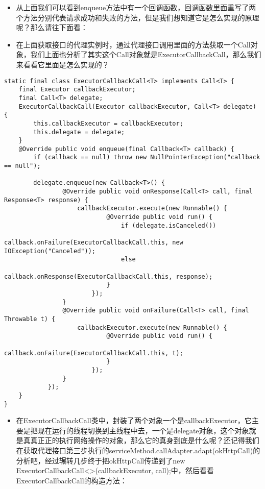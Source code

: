\documentclass[9pt, b5paper]{article}
\begin{document}
\begin{itemize}
\item 从上面我们可以看到enqueue方法中有一个回调函数，回调函数里面重写了两个方法分别代表请求成功和失败的方法，但是我们想知道它是怎么实现的原理呢？那么请往下面看：
\item 在上面获取接口的代理实例时，通过代理接口调用里面的方法获取一个Call对象，我们上面也分析了其实这个Call对象就是ExecutorCallbackCall，那么我们来看看它里面是怎么实现的？
\end{itemize}
\begin{verbatim}
static final class ExecutorCallbackCall<T> implements Call<T> {
    final Executor callbackExecutor;
    final Call<T> delegate;
    ExecutorCallbackCall(Executor callbackExecutor, Call<T> delegate) {
        this.callbackExecutor = callbackExecutor;
        this.delegate = delegate;
    }
    @Override public void enqueue(final Callback<T> callback) {
        if (callback == null) throw new NullPointerException("callback == null");

        delegate.enqueue(new Callback<T>() {
                @Override public void onResponse(Call<T> call, final Response<T> response) {
                    callbackExecutor.execute(new Runnable() {
                            @Override public void run() {
                                if (delegate.isCanceled()) 
                                    callback.onFailure(ExecutorCallbackCall.this, new IOException("Canceled"));
                                else 
                                    callback.onResponse(ExecutorCallbackCall.this, response);
                            }
                        });
                }
                @Override public void onFailure(Call<T> call, final Throwable t) {
                    callbackExecutor.execute(new Runnable() {
                            @Override public void run() {
                                callback.onFailure(ExecutorCallbackCall.this, t);
                            }
                        });
                }
            });
    }
}
\end{verbatim}
\begin{itemize}
\item 在ExecutorCallbackCall类中，封装了两个对象一个是callbackExecutor，它主要是把现在运行的线程切换到主线程中去，一个是delegate对象，这个对象就是真真正正的执行网络操作的对象，那么它的真身到底是什么呢？还记得我们在获取代理接口第三步执行的serviceMethod.callAdapter.adapt(okHttpCall)的分析吧，经过辗转几步终于把okHttpCall传递到了new ExecutorCallbackCall<>(callbackExecutor, call);中，然后看看ExecutorCallbackCall的构造方法：
\end{itemize}
\end{document}
